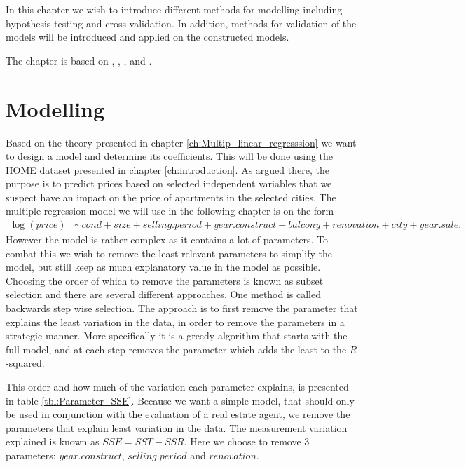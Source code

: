 In this chapter we wish to introduce different methods for modelling including hypothesis testing and cross-validation.
In addition, methods for validation of the models will be introduced and applied on the constructed models.

The chapter is based on \cite{Allison2012}, \cite{MadsenThyregod2011}, \cite{Hoeg2016}, \cite{Wooldridge2012} and \cite{Hastie2008}.

\section{Modelling} \label{sec:modelling}
Based on the theory presented in chapter \ref{ch:Multip_linear_regresssion} we want to design a model and determine its coefficients. 
This will be done using the HOME dataset presented in chapter \ref{ch:introduction}. 
As argued there, the purpose is to predict prices based on selected independent variables that we suspect have an impact on the price of apartments in the selected cities.
The multiple regression model we will use in the following chapter is on the form
\begin{align*}
    \log(\textit{price}) &\sim \textit{cond} + \textit{size} + \textit{selling.period} + \textit{year.construct} + \textit{balcony} + \textit{renovation} + \textit{city} + \textit{year.sale}.
\end{align*}
However the model is rather complex as it contains a lot of parameters.
To combat this we wish to remove the least relevant parameters to simplify the model, but still keep as much explanatory value in the model as possible.
Choosing the order of which to remove the parameters is known as subset selection and there are several different approaches.
One method is called backwards step wise selection. 
The approach is to first remove the parameter that explains the least variation in the data, in order to remove the parameters in a strategic manner.
More specifically it is a greedy algorithm that starts with the full model, and at each step removes the parameter which adds the least to the $R$-squared.

This order and how much of the variation each parameter explains, is presented in table \ref{tbl:Parameter_SSE}.
Because we want a simple model, that should only be used in conjunction with the evaluation of a real estate agent, we remove the parameters that explain least variation in the data. The measurement variation explained is known as $SSE = SST-SSR$. 
Here we choose to remove 3 parameters: $year.construct$, $selling.period$ and $renovation$. 


